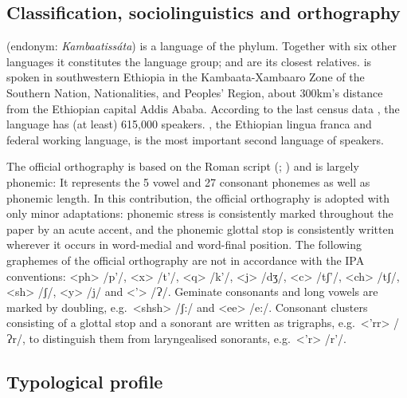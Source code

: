 \documentclass[output=paper,colorlinks,citecolor=brown,]{langscibook}
\begin{document}
\subsection{Classification, sociolinguistics and orthography}\label{sec:treis:1.1}

 (endonym: \textit{Kambaatissáta}) is a  language of the  phylum. Together with six other languages it constitutes the  language group;  and  are its closest relatives.  is spoken in southwestern Ethiopia in the Kambaata-Xambaaro Zone of the Southern Nation, Nationalities, and Peoples' Region, about 300km's distance from the Ethiopian capital Addis Ababa. According to the last census data \citep[91]{CSA2007}, the language has (at least) 615,000 speakers. , the Ethiopian lingua franca and federal working language, is the most important second language of  speakers. 

The official  orthography is based on the Roman script (\citealt[73--80]{Treis2008}; \citealt{Alemu2016}) and is largely phonemic: It represents the 5 vowel and 27 consonant phonemes as well as phonemic length. In this contribution, the official orthography is adopted with only minor adaptations: phonemic stress is consistently marked throughout the paper by an acute accent, and the phonemic glottal stop is consistently written wherever it occurs in word-medial and word-final position. The following graphemes of the official orthography are not in accordance with the IPA conventions: <ph> /p'/, <x> /t'/, <q> /k'/, <j> /dʒ/, <c> /tʃ'/, <ch> /tʃ/, <sh> /ʃ/, <y> /j/ and <'> /Ɂ/. Geminate consonants and long vowels are marked by doubling,  e.g.\ <shsh> /ʃ:/ and <ee> /e:/. Consonant clusters consisting of a glottal stop and a sonorant are written as trigraphs,  e.g.\ <'rr> /Ɂr/, to distinguish them from laryngealised sonorants,  e.g.\ <'r> /r'/.

\subsection{Typological profile}\label{sec:treis:1.2}
\end{document}
